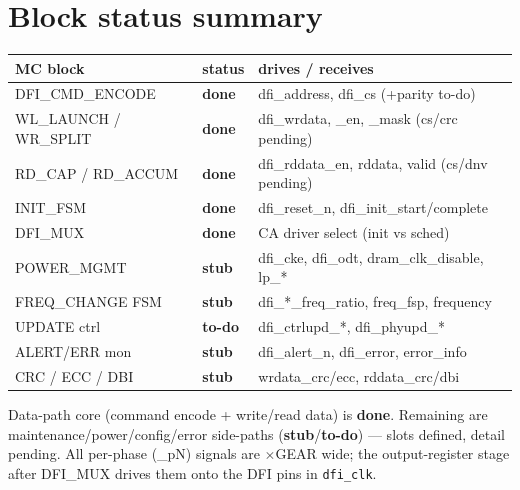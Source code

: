 \documentclass[9pt]{extarticle}
\newcommand{\done}{\textbf{\textcolor{gdone}{done}}}
\newcommand{\stub}{\textbf{\textcolor{gstub}{stub}}}
\newcommand{\todo}{\textbf{\textcolor{gtodo}{to-do}}}
\begin{document}
\section{Block status summary}
\begin{tabular}{>{\ttfamily}l l l}
\toprule
\textbf{MC block} & \textbf{status} & \textbf{drives / receives}\\ \midrule
DFI\_CMD\_ENCODE & \done & dfi\_address, dfi\_cs (+parity to-do)\\
WL\_LAUNCH / WR\_SPLIT & \done & dfi\_wrdata, \_en, \_mask (cs/crc pending)\\
RD\_CAP / RD\_ACCUM & \done & dfi\_rddata\_en, rddata, valid (cs/dnv pending)\\
INIT\_FSM & \done & dfi\_reset\_n, dfi\_init\_start/complete\\
DFI\_MUX & \done & CA driver select (init vs sched)\\
POWER\_MGMT & \stub & dfi\_cke, dfi\_odt, dram\_clk\_disable, lp\_*\\
FREQ\_CHANGE FSM & \stub & dfi\_*\_freq\_ratio, freq\_fsp, frequency\\
UPDATE ctrl & \todo & dfi\_ctrlupd\_*, dfi\_phyupd\_*\\
ALERT/ERR mon & \stub & dfi\_alert\_n, dfi\_error, error\_info\\
CRC / ECC / DBI & \stub & wrdata\_crc/ecc, rddata\_crc/dbi\\
\bottomrule
\end{tabular}

\vspace{4pt}
{\footnotesize Data-path core (command encode + write/read data) is \done. Remaining are
maintenance/power/config/error side-paths (\stub/\todo) --- slots defined, detail pending. All
per-phase (\_pN) signals are $\times$GEAR wide; the output-register stage after DFI\_MUX drives
them onto the DFI pins in \texttt{dfi\_clk}.}
\end{document}
